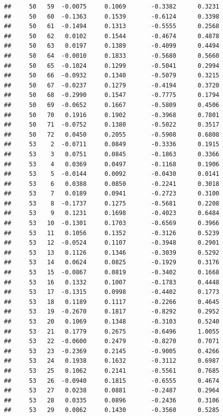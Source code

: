 \documentclass[
]{article}
\begin{document}
\begin{verbatim}
##     50   59  -0.0075     0.1069       -0.3382      0.3231  
##     50   60  -0.1363     0.1539       -0.6124      0.3398  
##     50   61  -0.1494     0.1313       -0.5555      0.2568  
##     50   62   0.0102     0.1544       -0.4674      0.4878  
##     50   63   0.0197     0.1389       -0.4099      0.4494  
##     50   64  -0.0010     0.1833       -0.5680      0.5660  
##     50   65  -0.1024     0.1299       -0.5041      0.2994  
##     50   66  -0.0932     0.1340       -0.5079      0.3215  
##     50   67  -0.0237     0.1279       -0.4194      0.3720  
##     50   68  -0.2990     0.1547       -0.7775      0.1794  
##     50   69  -0.0652     0.1667       -0.5809      0.4506  
##     50   70   0.1916     0.1902       -0.3968      0.7801  
##     50   71  -0.0752     0.1380       -0.5022      0.3517  
##     50   72   0.0450     0.2055       -0.5908      0.6808  
##     53    2  -0.0711     0.0849       -0.3336      0.1915  
##     53    3   0.0751     0.0845       -0.1863      0.3366  
##     53    4   0.0369     0.0497       -0.1168      0.1906  
##     53    5  -0.0144     0.0092       -0.0430      0.0141  
##     53    6   0.0388     0.0850       -0.2241      0.3018  
##     53    7   0.0189     0.0941       -0.2723      0.3100  
##     53    8  -0.1737     0.1275       -0.5681      0.2208  
##     53    9   0.1231     0.1698       -0.4023      0.6484  
##     53   10  -0.1301     0.1703       -0.6569      0.3966  
##     53   11   0.1056     0.1352       -0.3126      0.5239  
##     53   12  -0.0524     0.1107       -0.3948      0.2901  
##     53   13   0.1126     0.1346       -0.3039      0.5292  
##     53   14   0.0624     0.0825       -0.1929      0.3176  
##     53   15  -0.0867     0.0819       -0.3402      0.1668  
##     53   16   0.1332     0.1007       -0.1783      0.4448  
##     53   17  -0.1315     0.0998       -0.4402      0.1773  
##     53   18   0.1189     0.1117       -0.2266      0.4645  
##     53   19  -0.2670     0.1817       -0.8292      0.2952  
##     53   20   0.1069     0.1348       -0.3103      0.5240  
##     53   21   0.1779     0.2675       -0.6496      1.0055  
##     53   22  -0.0600     0.2479       -0.8270      0.7071  
##     53   23  -0.2369     0.2145       -0.9005      0.4266  
##     53   24   0.1938     0.1632       -0.3112      0.6987  
##     53   25   0.1062     0.2141       -0.5561      0.7685  
##     53   26  -0.0940     0.1815       -0.6555      0.4674  
##     53   27   0.0238     0.0881       -0.2487      0.2964  
##     53   28   0.0335     0.0896       -0.2436      0.3106  
##     53   29   0.0862     0.1430       -0.3560      0.5285  

\end{verbatim}
\end{document}
